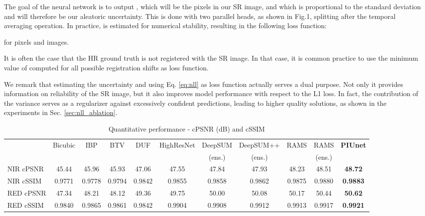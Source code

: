 \documentclass[journal]{IEEEtran}
\begin{document}
The goal of the neural network is to output , which will be the pixels in our SR image, and  which is proportional to the standard deviation and will therefore be our aleatoric uncertainty. This is done with two parallel heads, as shown in Fig.1, splitting after the temporal averaging operation. In practice,  is estimated for numerical stability, resulting in the following loss function:

for  pixels and  images.

It is often the case that the HR ground truth is not registered with the SR image. In that case, it is common practice \cite{rarefin2020multi,molini2019deepsum,salvetti2020multi} to use the minimum value of  computed for all possible registration shifts as loss function.

We remark that estimating the uncertainty and using Eq. \eqref{eq:nll} as loss function actually serves a dual purpose. Not only it provides information on reliability of the SR image, but it also improves model performance with respect to the L1 loss. In fact, the contribution of the variance serves as a regularizer against excessively confident predictions, leading to higher quality solutions, as shown in the experiments in Sec. \ref{sec:nll_ablation}.

\begin{table*}[htb]
\centering
\caption{Quantitative performance - cPSNR (dB) and cSSIM}
\label{table:quantitative}
\begin{tabular}{lcccccccccc}
          & \multirow{2}{*}{Bicubic} & \multirow{2}{*}{IBP \cite{IRANI1991231}} & \multirow{2}{*}{BTV \cite{1331445}} & \multirow{2}{*}{DUF \cite{Jo_2018_CVPR}} & HighResNet & DeepSUM  & DeepSUM++ & \multirow{2}{*}{RAMS \cite{salvetti2020multi}} & RAMS \cite{salvetti2020multi} & \multirow{2}{*}{\textbf{PIUnet}} \\
          & & & & & \cite{rarefin2020multi} & (ens.) \cite{molini2019deepsum} & (ens.) \cite{molini2020deepsumpp} & & (ens.) &\\ \hline \hline
NIR cPSNR & 45.44 & 45.96 & 45.93 & 47.06 & 47.55 & 47.84 & 47.93 & 48.23 & 48.51 & \textbf{48.72}  \\
NIR cSSIM & 0.9771 & 0.9778 & 0.9794 & 0.9842 & 0.9855 & 0.9858 & 0.9862 & 0.9875 & 0.9880 & \textbf{0.9883}  \\
RED cPSNR & 47.34 & 48.21 & 48.12 & 49.36 & 49.75 & 50.00 & 50.08 & 50.17 & 50.44 & \textbf{50.62} \\
RED cSSIM & 0.9840 & 0.9865 & 0.9861 & 0.9842 & 0.9904 & 0.9908 & 0.9912 & 0.9913 & 0.9917 & \textbf{0.9921} \\ \hline
\end{tabular}
\end{table*}
\end{document}
